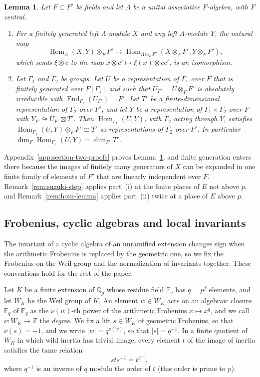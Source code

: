 \documentclass[a4paper,11pt]{amsart}
\newtheorem{lemma}[theorem]{Lemma}
\theoremstyle{definition}
\theoremstyle{remark}
\numberwithin{equation}{section}
\newcommand{\Q}{\mathbb{Q}}
\newcommand{\Z}{\mathbb{Z}}
\DeclareMathOperator{\End}{End}
\newcommand{\F}{\mathbb{F}}
\DeclareMathOperator{\Hom}{Hom}
\begin{document}
\begin{lemma}\label{lem:hom-base-change}
Let $F\subset F'$ be fields and let $\Lambda$ be a unital associative $F$-algebra, with $F$ central.
\begin{enumerate}
\item[(i)] For a finitely generated left $\Lambda$-module $X$ and any left $\Lambda$-module $Y$, the natural map
\[
\Hom_\Lambda(X,Y)\otimes_{F}F'\longrightarrow\Hom_{\Lambda\otimes_{F}F'}(X\otimes_{F}F',Y\otimes_{F}F'),
\]
which sends $\xi\otimes c$ to the map $x\otimes c'\mapsto\xi(x)\otimes cc'$, is an isomorphism.
\item[(ii)] Let $\Gamma_1$ and $\Gamma_2$ be groups. Let $U$ be a representation of $\Gamma_1$ over $F$ that is finitely generated over $F[\Gamma_1]$ and such that $U_{F'}=U\otimes_{F}F'$ is absolutely irreducible with $\End_{\Gamma_1}(U_{F'})=F'$. Let $T'$ be a finite-dimensional representation of $\Gamma_2$ over $F'$, and let $Y$ be a representation of $\Gamma_1\times\Gamma_2$ over $F$ with $Y_{F'}\cong U_{F'}\boxtimes T'$. Then $\Hom_{\Gamma_1}(U,Y)$, with $\Gamma_2$ acting through $Y$, satisfies $\Hom_{\Gamma_1}(U,Y)\otimes_{F}F'\cong T'$ as representations of $\Gamma_2$ over $F'$. In particular $\dim_F\Hom_{\Gamma_1}(U,Y)=\dim_{F'}T'$.
\end{enumerate}
\end{lemma}

Appendix~\ref{app:section-two-proofs} proves Lemma~\ref{lem:hom-base-change}, and finite generation enters there because the images of finitely many generators of $X$ can be expanded in one finite family of elements of $F'$ that are linearly independent over $F$. Remark~\ref{rem:suzuki-step} applies part~(i) at the finite places of $E$ not above $p$, and Remark~\ref{rem:hom-lemma} applies part~(ii) twice at a place of $E$ above $p$.

\subsection{Frobenius, cyclic algebras and local invariants}
\label{subsec:local}

The invariant of a cyclic algebra of an unramified extension changes sign when the arithmetic Frobenius is replaced by the geometric one, so we fix the Frobenius on the Weil group and the normalization of invariants together. These conventions hold for the rest of the paper.

Let $K$ be a finite extension of $\Q_p$ whose residue field $\F_q$ has $q=p^f$ elements, and let $W_K$ be the Weil group of $K$. An element $w\in W_K$ acts on an algebraic closure $\overline{\F}_q$ of $\F_q$ as the $\nu(w)$-th power of the arithmetic Frobenius $x\mapsto x^q$, and we call $\nu\colon W_K\to\Z$ the \emph{degree}. We fix a lift $s\in W_K$ of geometric Frobenius, so that $\nu(s)=-1$, and we write $|w|=q^{\nu(w)}$, so that $|s|=q^{-1}$. In a finite quotient of $W_K$ in which wild inertia has trivial image, every element $t$ of the image of inertia satisfies the tame relation
\[
 sts^{-1}=t^{q^{-1}},
\]
where $q^{-1}$ is an inverse of $q$ modulo the order of $t$ (this order is prime to $p$).
\end{document}
